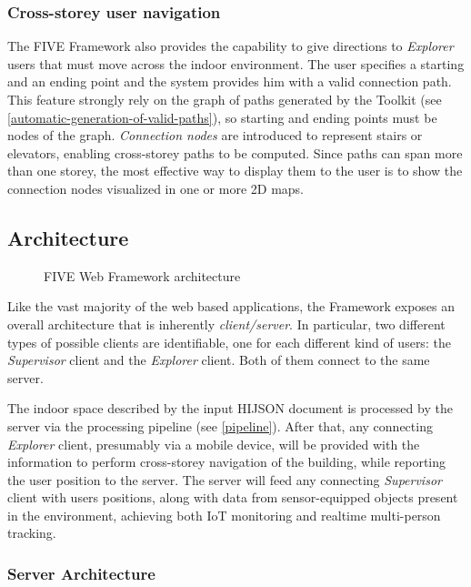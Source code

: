 \subsubsection{Cross-storey user navigation}\label{cross-storey-user-navigation}

The FIVE Framework also provides the capability to give directions to
\emph{Explorer} users that must move across the indoor environment. The user
specifies a starting and an ending point and the system provides him with a
valid connection path. This feature strongly rely on the graph of paths
generated by the Toolkit (see \ref{automatic-generation-of-valid-paths}), so
starting and ending points must be nodes of the graph. \emph{Connection nodes}
are introduced to represent stairs or elevators, enabling cross-storey paths
to be computed. Since paths can span more than one storey, the most effective
way to display them to the user is to show the connection nodes visualized in
one or more 2D maps.

\subsection{Architecture}\label{architecture}

\begin{figure*}[htb]
\centering
{}
\caption{FIVE Web Framework architecture}
\label{fig:architecture}
\end{figure*}

Like the vast majority of the web based applications, the Framework exposes an
overall architecture that is inherently \emph{client/server}. In particular,
two different types of possible clients are identifiable, one for each different 
kind of users: the \emph{Supervisor} client and the \emph{Explorer} client. 
Both of them connect to the same server.

The indoor space described by the input HIJSON document is processed by the
server via the processing pipeline (see \ref{pipeline}). After that, any
connecting \emph{Explorer} client, presumably via a mobile device, will be
provided with the information to perform cross-storey navigation of the
building, while reporting the user position to the server. The server will
feed any connecting \emph{Supervisor} client with users positions, along with
data from sensor-equipped  objects present in the environment, achieving both
IoT monitoring and realtime multi-person tracking.

\subsubsection{Server Architecture}\label{server-architecture}

